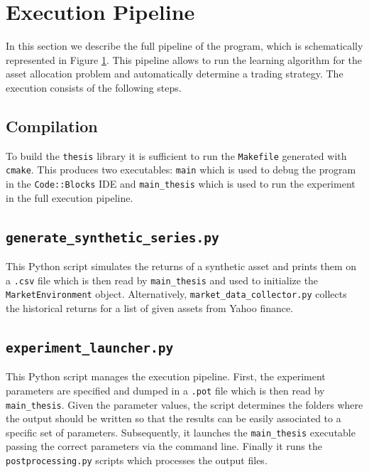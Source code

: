 \section{Execution Pipeline}
\label{sec:execution_pipeline}

In this section we describe the full pipeline of the program, which is schematically represented in Figure \ref{sec:execution_pipeline}. This pipeline allows to run the learning algorithm for the asset allocation problem and automatically determine a trading strategy. The execution consists of the following steps. 

\subsection{Compilation} To build the \lstinline{thesis} library it is sufficient to run the \lstinline{Makefile} generated with \lstinline{cmake}. This produces two executables: \lstinline{main} which is used to debug the program in the \lstinline{Code::Blocks} IDE and \lstinline{main_thesis} which is used to run the experiment in the full execution pipeline. 

\subsection{\lstinline{generate_synthetic_series.py}} This Python script simulates the returns of a synthetic asset and prints them on a \lstinline{.csv} file which is then read by \lstinline{main_thesis} and used to initialize the \lstinline{MarketEnvironment} object. Alternatively, \lstinline{market_data_collector.py} collects the historical returns for a list of given assets from Yahoo finance.

\subsection{\lstinline{experiment_launcher.py}} This Python script manages the execution pipeline. First, the experiment parameters are specified and dumped in a \lstinline{.pot} file which is then read by \lstinline{main_thesis}. Given the parameter values, the script determines the folders where the output should be written so that the results can be easily associated to a specific set of parameters. Subsequently, it launches the \lstinline{main_thesis} executable passing the correct parameters via the command line. Finally it runs the \lstinline{postprocessing.py} scripts which processes the output files.  

